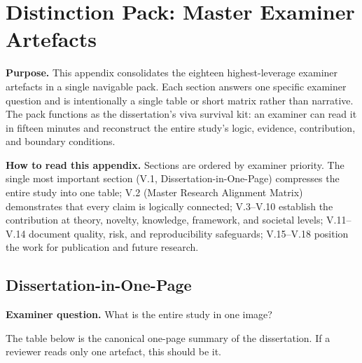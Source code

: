 \chapter{Distinction Pack: Master Examiner Artefacts}
\label{app:distinction_pack}

\noindent\textbf{Purpose.} This appendix consolidates the eighteen highest-leverage examiner artefacts in a single navigable pack. Each section answers one specific examiner question and is intentionally a single table or short matrix rather than narrative. The pack functions as the dissertation's viva survival kit: an examiner can read it in fifteen minutes and reconstruct the entire study's logic, evidence, contribution, and boundary conditions.

\vspace{0.5em}
\noindent\textbf{How to read this appendix.} Sections are ordered by examiner priority. The single most important section (V.1, Dissertation-in-One-Page) compresses the entire study into one table; V.2 (Master Research Alignment Matrix) demonstrates that every claim is logically connected; V.3--V.10 establish the contribution at theory, novelty, knowledge, framework, and societal levels; V.11--V.14 document quality, risk, and reproducibility safeguards; V.15--V.18 position the work for publication and future research.

\section{Dissertation-in-One-Page}
\label{app:distinction_one_page}

\noindent\textbf{Examiner question.} What is the entire study in one image?

\noindent The table below is the canonical one-page summary of the dissertation. If a reviewer reads only one artefact, this should be it.

